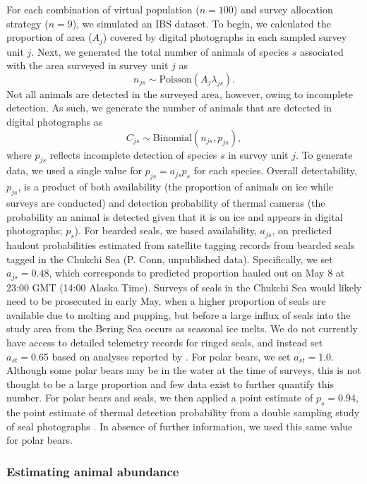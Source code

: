 \documentclass[]{rsos}%
\begin{document}
{For each combination of virtual population ($n=100$) and survey allocation strategy ($n=9$), we simulated an IBS dataset.  To begin, we calculated the proportion of area ($A_j$) covered by digital photographs in each sampled survey unit $j$.  Next, we generated the total number of animals of species $s$ associated with the area surveyed in survey unit $j$ as
\begin{equation*}
  n_{js} \sim \text{Poisson} (A_j \lambda_{js}).
\end{equation*}
Not all animals are detected in the surveyed area, however, owing to incomplete detection.  As such, we generate the number of animals that are detected in digital photographs as
\begin{equation*}
  C_{js} \sim \text{Binomial} (n_{js},p_{js}),
\end{equation*}
where $p_{js}$ reflects incomplete detection of species $s$ in survey unit $j$. To generate data, we used a single value for $p_{js} = a_{js}p_s$ for each species.  Overall detectability, $p_{js}$, is a product of both availability (the proportion of animals on ice while surveys are conducted) and detection probability of thermal cameras (the probability an animal is detected given that it is on ice and appears in digital photographs; $p_s$).  For bearded seals, we based availability, $a_{js}$, on predicted haulout probabilities estimated from satellite tagging records from bearded seals tagged in the Chukchi Sea (P. Conn, unpublished data).  Specifically, we set $a_{js}=0.48$, which corresponds to predicted proportion hauled out on May 8 at 23:00 GMT (14:00 Alaska Time).  Surveys of seals in the Chukchi Sea would likely need to be prosecuted in early May, when a higher proportion of seals are available due to molting and pupping, but before a large influx of seals into the study area from the Bering Sea occurs as seasonal ice melts. We do not currently have access to detailed telemetry records for ringed seals, and instead set $a_{st}=0.65$ based on analyses reported by \cite{Bengtson2005}.  For polar bears, we set $a_{st}=1.0$.  Although some polar bears may be in the water at the time of surveys, this is not thought to be a large proportion and few data exist to further quantify this number.  For polar bears and seals, we then applied a point estimate of $p_s=0.94$, the point estimate of thermal detection probability from a double sampling study of seal photographs \cite{ConnEtAl2014}.  In absence of further information, we used this same value for polar bears.

\subsubsection{Estimating animal abundance}

}
\end{document}

